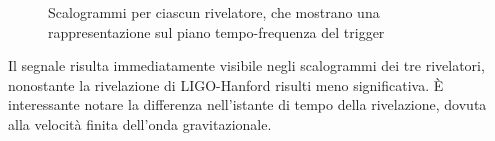 \begin{figure}[hbt!]
	\vspace{-10pt}
	\centering
	\vspace{-8pt}
	\caption{Scalogrammi per ciascun rivelatore, che mostrano una rappresentazione sul piano tempo-frequenza del trigger}
	\label{fig:spettrogramma_apr4}
	\vspace{-10pt}
\end{figure}
Il segnale risulta immediatamente visibile negli scalogrammi dei tre rivelatori, nonostante la rivelazione di LIGO-Hanford risulti meno significativa. È interessante notare la differenza nell'istante di tempo della rivelazione, dovuta alla velocità finita dell'onda gravitazionale.


